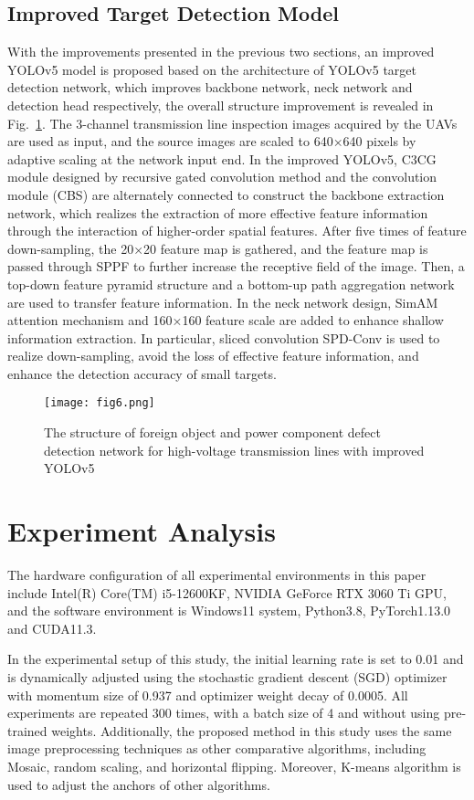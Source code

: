 \documentclass[sn-mathphys,Numbered]{sn-jnl}%
\theoremstyle{thmstyleone}%
\theoremstyle{thmstyletwo}%
\theoremstyle{thmstylethree}%
\begin{document}
\subsection{Improved Target Detection Model}

With the improvements presented in the previous two sections, an improved YOLOv5 model is proposed based on the architecture of YOLOv5 target detection network, which improves backbone network, neck network and detection head respectively, the overall structure improvement is revealed in Fig.~\ref{fig6}. The 3-channel transmission line inspection images acquired by the UAVs are used as input, and the source images are scaled to 640×640 pixels by adaptive scaling at the network input end. In the improved YOLOv5, C3CG module designed by recursive gated convolution method and the convolution module (CBS) are alternately connected to construct the backbone extraction network, which realizes the extraction of more effective feature information through the interaction of higher-order spatial features. After five times of feature down-sampling, the 20×20 feature map is gathered, and the feature map is passed through SPPF to further increase the receptive field of the image. Then, a top-down feature pyramid structure and a bottom-up path aggregation network are used to transfer feature information. In the neck network design, SimAM attention mechanism and 160×160 feature scale are added to enhance shallow information extraction. In particular, sliced convolution SPD-Conv is used to realize down-sampling, avoid the loss of effective feature information, and enhance the detection accuracy of small targets. 

\begin{figure}[h]%
\centering
\texttt{[image: fig6.png]}
\caption{The structure of foreign object and power component defect detection network for high-voltage transmission lines with improved YOLOv5}\label{fig6}
\end{figure}

\section{Experiment Analysis}\label{sec3}

The hardware configuration of all experimental environments in this paper include Intel(R) Core(TM) i5-12600KF, NVIDIA GeForce RTX 3060 Ti GPU, and the software environment is Windows11 system, Python3.8, PyTorch1.13.0 and CUDA11.3.

In the experimental setup of this study, the initial learning rate is set to 0.01 and is dynamically adjusted using the stochastic gradient descent (SGD) optimizer with momentum size of 0.937 and optimizer weight decay of 0.0005. All experiments are repeated 300 times, with a batch size of 4 and without using pre-trained weights. Additionally, the proposed method in this study uses the same image preprocessing techniques as other comparative algorithms, including Mosaic, random scaling, and horizontal flipping. Moreover, K-means algorithm is used to adjust the anchors of other algorithms.
\end{document}
